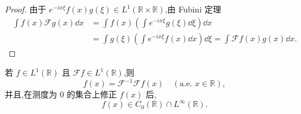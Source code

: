 \begin{proof}
由于 $e^{-ix\xi}f(x)g(\xi) \in L^{1}(\mathbb{R}\times\mathbb{R})$,由 Fubini 定理
\begin{align*}
\int f(x)\mathcal{F}g(x)\dd x & = \int f(x)\left(\int e^{-ix\xi}g(\xi)\dd \xi\right)\dd x \\
& = \int g(\xi)\left(\int e^{-ix\xi}f(x)\dd x\right)\dd \xi = \int \mathcal{F}f(x)g(x)\dd x.
\end{align*}
\end{proof}

\begin{theorem}\label{thm:1.2.5}
若 $f \in L^{1}(\mathbb{R})$ 且 $\mathcal{F}f \in L^{1}(\mathbb{R})$,则
\begin{equation*}
f(x) = \mathcal{F}^{-1}\mathcal{F}f(x) \quad (\text{a.e. } x \in \mathbb{R}),
\end{equation*}
并且,在测度为 $0$ 的集合上修正 $f(x)$ 后,
\begin{equation*}
f(x) \in C_{0}(\mathbb{R}) \cap L^{\infty}(\mathbb{R}).
\end{equation*}
\end{theorem}

